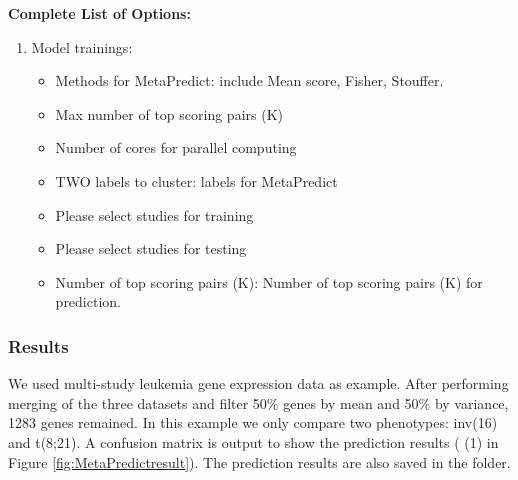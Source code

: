 \textbf{Complete List of Options:} 
\begin{enumerate}
\item Model trainings: 
\begin{itemize}
\item Methods for MetaPredict: include Mean score, Fisher, Stouffer.
\item Max number of top scoring pairs (K)
\item Number of cores for parallel computing
\item TWO labels to cluster: labels for MetaPredict
\item Please select studies for training
\item Please select studies for testing
\item Number of top scoring pairs (K): Number of top scoring pairs (K) for prediction.
\end{itemize}

\end{enumerate}

\subsubsection{Results}

We used multi-study leukemia gene expression data as example.
After performing merging of the three datasets and filter 50\% genes by mean and 50\% by variance, 1283 genes remained.
In this example we only compare two phenotypes: inv(16) and t(8;21). 
A confusion matrix is output to show the prediction results ({\color{red} (1)} in Figure \ref{fig:MetaPredictresult}).
The prediction results are also saved in the folder.

